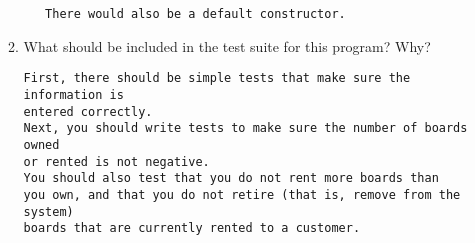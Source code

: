 \begin{enumerate}
\begin{enumerate}
\begin{verbatim}
   There would also be a default constructor.
\end{verbatim}
			\item What should be included in the test suite for 
				this program?  Why?
\begin{verbatim}
First, there should be simple tests that make sure the information is
entered correctly.
Next, you should write tests to make sure the number of boards owned
or rented is not negative.  
You should also test that you do not rent more boards than 
you own, and that you do not retire (that is, remove from the system)
boards that are currently rented to a customer.
\end{verbatim}
		\end{enumerate}
\end{enumerate}

